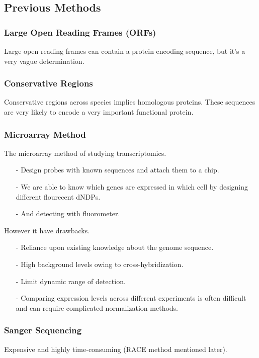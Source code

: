 \documentclass[12pt]{article}
\begin{document}
{	\subsection{Previous Methods}
	\subsubsection{Large Open Reading Frames (ORFs)}
	Large open reading frames can contain a protein encoding sequence, but it's a very vague determination.
	
	\subsubsection{Conservative Regions}
	Conservative regions across species implies homologous proteins. These sequences are very likely to encode a very important functional protein.
	
	\subsubsection{Microarray Method}
	The microarray method of studying transcriptomics.
	\begin{itemize}
		\item [-] Design probes with known sequences and attach them to a chip. 
		\item [-]We are able to know which genes are expressed in which cell by designing different flourecent dNDPs.
		\item [-]And detecting with fluorometer.
	\end{itemize}
	However it have drawbacks.
	\begin{itemize}
		\item [-]Reliance upon existing knowledge about the genome sequence.
		\item [-]High background levels owing to cross-hybridization.
		\item [-]Limit dynamic range of detection.
		\item [-]Comparing expression levels across different experiments is often difficult and can require complicated normalization methods.
	\end{itemize}
	
	\subsubsection{Sanger Sequencing}
	Expensive and highly time-consuming (RACE method mentioned later).
	
}
\end{document}
